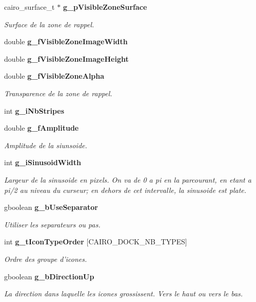 \begin{CompactItemize}
cairo\_\-surface\_\-t $\ast$ {\bf g\_\-pVisibleZoneSurface}
\begin{CompactList}\small\item\em Surface de la zone de rappel. \item\end{CompactList}\item 
double {\bf g\_\-fVisibleZoneImageWidth}
\item 
double {\bf g\_\-fVisibleZoneImageHeight}
\item 
double {\bf g\_\-fVisibleZoneAlpha}
\begin{CompactList}\small\item\em Transparence de la zone de rappel. \item\end{CompactList}\item 
int {\bf g\_\-iNbStripes}
\item 
double {\bf g\_\-fAmplitude}
\begin{CompactList}\small\item\em Amplitude de la siunsoide. \item\end{CompactList}\item 
int {\bf g\_\-iSinusoidWidth}
\begin{CompactList}\small\item\em Largeur de la sinusoide en pixels. On va de 0 a pi en la parcourant, en etant a pi/2 au niveau du curseur; en dehors de cet intervalle, la sinusoide est plate. \item\end{CompactList}\item 
gboolean {\bf g\_\-bUseSeparator}
\begin{CompactList}\small\item\em Utiliser les separateurs ou pas. \item\end{CompactList}\item 
int {\bf g\_\-tIconTypeOrder} [CAIRO\_\-DOCK\_\-NB\_\-TYPES]
\begin{CompactList}\small\item\em Ordre des groupe d'icones. \item\end{CompactList}\item 
gboolean {\bf g\_\-bDirectionUp}
\begin{CompactList}\small\item\em La direction dans laquelle les icones grossissent. Vers le haut ou vers le bas. \item\end{CompactList}\item 

\end{CompactItemize}
